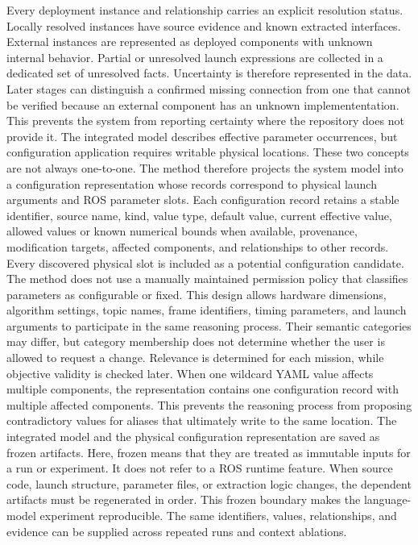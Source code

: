 Every deployment instance and relationship carries an explicit resolution status. Locally resolved instances have source evidence and known extracted interfaces. External instances are represented as deployed components with unknown internal behavior. Partial or unresolved launch expressions are collected in a dedicated set of unresolved facts.
Uncertainty is therefore represented in the data. Later stages can distinguish a confirmed missing connection from one that cannot be verified because an external component has an unknown implemententation. This prevents the system from reporting certainty where the repository does not provide it.
The integrated model describes effective parameter occurrences, but configuration application requires writable physical locations. These two concepts are not always one-to-one. The method therefore projects the system model into a configuration representation whose records correspond to physical launch arguments and ROS parameter slots.
Each configuration record retains a stable identifier, source name, kind, value type, default value, current effective value, allowed values or known numerical bounds when available, provenance, modification targets, affected components, and relationships to other records. Every discovered physical slot is included as a potential configuration candidate. The method does not use a manually maintained permission policy that classifies parameters as configurable or fixed.
This design allows hardware dimensions, algorithm settings, topic names, frame identifiers, timing parameters, and launch arguments to participate in the same reasoning process. Their semantic categories may differ, but category membership does not determine whether the user is allowed to request a change. Relevance is determined for each mission, while objective validity is checked later.
When one wildcard YAML value affects multiple components, the representation contains one configuration record with multiple affected components. This prevents the reasoning process from proposing contradictory values for aliases that ultimately write to the same location.
The integrated model and the physical configuration representation are saved as frozen artifacts. Here, frozen means that they are treated as immutable inputs for a run or experiment. It does not refer to a ROS runtime feature. When source code, launch structure, parameter files, or extraction logic changes, the dependent artifacts must be regenerated in order.
This frozen boundary makes the language-model experiment reproducible. The same identifiers, values, relationships, and evidence can be supplied across repeated runs and context ablations.

